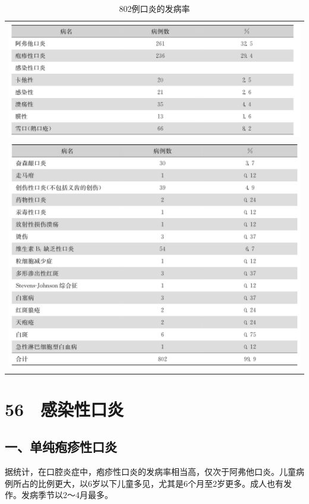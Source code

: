 \begin{longtable}{c}
 \caption{802例口炎的发病率}
 \label{tab18-2}
 \endfirsthead
 \caption[]{802例口炎的发病率}
 \endhead
 \includegraphics[width=\textwidth,height=\textheight,keepaspectratio]{./images/Image00114.jpg}\\
 \includegraphics[width=\textwidth,height=\textheight,keepaspectratio]{./images/Image00115.jpg}
 \end{longtable}

\protect\hypertarget{text00149.html}{}{}

\section{56　感染性口炎}

\subsection{一、单纯疱疹性口炎}

据统计，在口腔炎症中，疱疹性口炎的发病率相当高，仅次于阿弗他口炎。儿童病例所占的比例更大，以6岁以下儿童多见，尤其是6个月至2岁更多。成人也有发作。发病季节以2～4月最多。

